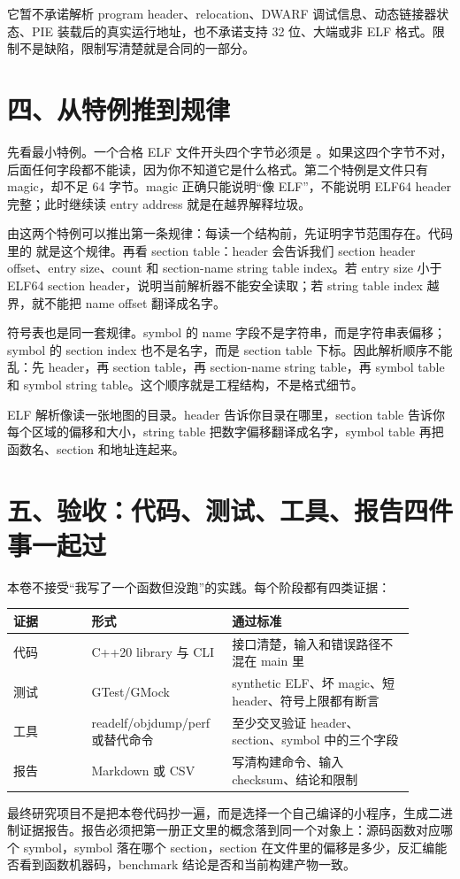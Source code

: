 它暂不承诺解析 program header、relocation、DWARF 调试信息、动态链接器状态、PIE 装载后的真实运行地址，也不承诺支持 32 位、大端或非 ELF 格式。限制不是缺陷，限制写清楚就是合同的一部分。

\section{四、从特例推到规律}

先看最小特例。一个合格 ELF 文件开头四个字节必须是 。如果这四个字节不对，后面任何字段都不能读，因为你不知道它是什么格式。第二个特例是文件只有 magic，却不足 64 字节。magic 正确只能说明“像 ELF”，不能说明 ELF64 header 完整；此时继续读 entry address 就是在越界解释垃圾。

由这两个特例可以推出第一条规律：每读一个结构前，先证明字节范围存在。代码里的  就是这个规律。再看 section table：header 会告诉我们 section header offset、entry size、count 和 section-name string table index。若 entry size 小于 ELF64 section header，说明当前解析器不能安全读取；若 string table index 越界，就不能把 name offset 翻译成名字。

符号表也是同一套规律。symbol 的 name 字段不是字符串，而是字符串表偏移；symbol 的 section index 也不是名字，而是 section table 下标。因此解析顺序不能乱：先 header，再 section table，再 section-name string table，再 symbol table 和 symbol string table。这个顺序就是工程结构，不是格式细节。

\begin{mentalmodel}
ELF 解析像读一张地图的目录。header 告诉你目录在哪里，section table 告诉你每个区域的偏移和大小，string table 把数字偏移翻译成名字，symbol table 再把函数名、section 和地址连起来。
\end{mentalmodel}

\section{五、验收：代码、测试、工具、报告四件事一起过}

本卷不接受“我写了一个函数但没跑”的实践。每个阶段都有四类证据：

\begin{longtable}{p{0.18\linewidth}p{0.30\linewidth}p{0.42\linewidth}}
证据 & 形式 & 通过标准 \\
\hline
代码 & C++20 library 与 CLI & 接口清楚，输入和错误路径不混在 main 里 \\
测试 & GTest/GMock & synthetic ELF、坏 magic、短 header、符号上限都有断言 \\
工具 & readelf/objdump/perf 或替代命令 & 至少交叉验证 header、section、symbol 中的三个字段 \\
报告 & Markdown 或 CSV & 写清构建命令、输入 checksum、结论和限制 \\
\end{longtable}

最终研究项目不是把本卷代码抄一遍，而是选择一个自己编译的小程序，生成二进制证据报告。报告必须把第一册正文里的概念落到同一个对象上：源码函数对应哪个 symbol，symbol 落在哪个 section，section 在文件里的偏移是多少，反汇编能否看到函数机器码，benchmark 结论是否和当前构建产物一致。
